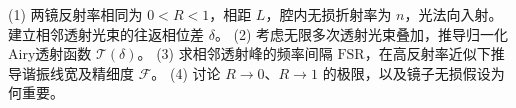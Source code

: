(1) 两镜反射率相同为 \(0<R<1\)，相距 \(L\)，腔内无损折射率为 \(n\)，光法向入射。建立相邻透射光束的往返相位差 \(\delta\)。
(2) 考虑无限多次透射光束叠加，推导归一化Airy透射函数 \(\mathcal T(\delta)\)。
(3) 求相邻透射峰的频率间隔 \(\mathrm{FSR}\)，在高反射率近似下推导谐振线宽及精细度 \(\mathcal F\)。
(4) 讨论 \(R\to0\)、\(R\to1\) 的极限，以及镜子无损假设为何重要。
